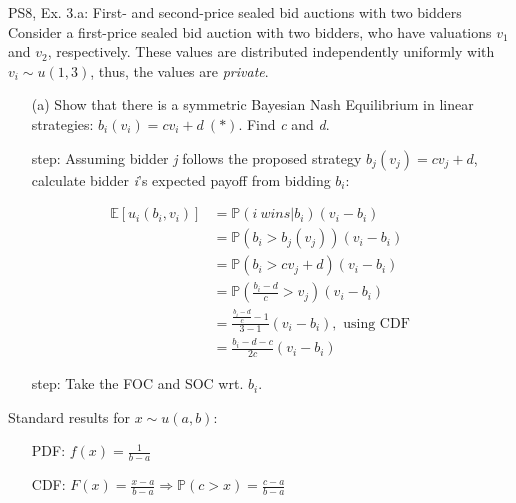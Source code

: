 \begin{frame}{PS8, Ex. 3.a: First- and second-price sealed bid auctions with two bidders}
    Consider a first-price sealed bid auction with two bidders, who have valuations $v_1$ and $v_2$, respectively. These values are distributed independently uniformly with $v_i\sim u(1,3)$, thus, the values are \textit{private}.
    \vspace{-4pt}
    \begin{itemize}
      \item[(a)] Show that there is a symmetric Bayesian Nash Equilibrium in linear strategies: $b_i(v_i) = cv_i + d\ (*)$. Find \textit{c} and \textit{d}.
    \end{itemize}
    \vspace{-8pt}
    \begin{multicols}{2}
      \begin{itemize}
        \item[\nth{1} step:] Assuming bidder \textit{j} follows the proposed strategy $b_j(v_j) = cv_j + d$, calculate bidder \textit{i}'s expected payoff from bidding $b_i$:
      \end{itemize}
      \vspace{-4pt}
      \begin{align*}
        \mathbb{E}[u_i(b_i,v_i)]&=\mathbb{P}(i\ wins|b_i)(v_i-b_i)\\
                                &=\mathbb{P}(b_i>b_j(v_j))(v_i-b_i)\\
                                &=\mathbb{P}(b_i>cv_j+d)(v_i-b_i)\\
                                &=\mathbb{P}\left(\frac{b_i-d}{c}>v_j\right)(v_i-b_i)\\
                                &=\frac{\frac{b_i-d}{c}-1}{3-1}(v_i-b_i),\text{ using CDF}\\
                                &=\frac{b_i-d-c}{2c}(v_i-b_i)
      \end{align*}
      \vspace{-10pt}
      \begin{itemize}
        \item[\nth{2} step:] Take the FOC and SOC wrt. $b_i$.
      \end{itemize}
      \vfill\null\columnbreak
      Standard results for $x\sim u(a, b):$
      \vspace{-6pt}
      \begin{enumerate}
        \item[PDF:] $f(x)=\frac{1}{b-a}$
        \item[CDF:] $F(x)=\frac{x-a}{b-a}\Rightarrow\mathbb{P}(c>x)=\frac{c-a}{b-a}$

\end{enumerate}
\end{multicols}
\end{frame}
